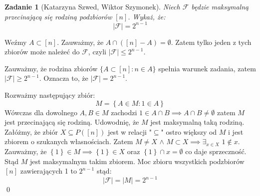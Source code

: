 \documentclass{mwart}
\newtheorem{zad}{Zadanie}[section]
\begin{document}
\begin{zad}[Katarzyna Szwed, Wiktor Szymonek]
    Niech $\mathcal{F}$ będzie maksymalną przecinającą się rodziną podzbiorów $[n]$.
    Wykaż, że:
    \[ |\mathcal{F}| = 2^{n-1} \]
\end{zad}
\begin{mdframed}
    Weźmy $A \subset [n]$. Zauważmy, że $A \cap ([n] - A) = \emptyset$. 
    Zatem tylko jeden z tych zbiorów może należeć do $\mathcal{F}$, czyli $|\mathcal{F}| \leq 2^{n-1}$.

    Zauważmy, że rodzina zbiorów $\{A \subset [n] : n \in A\}$ spełnia warunek zadania, zatem $|\mathcal{F}| \geq 2^{n-1}$. 
    Oznacza to, że $|\mathcal{F}| = 2^{n-1}$.
\end{mdframed}
\begin{mdframed}
    Rozważmy następujący zbiór:
    \[M = \left\{A\in M : 1 \in A\right\}\]
    Wówczas dla dowolnego $A,B \in M$ zachodzi $1 \in A \cap B \implies A\cap B \ne \emptyset$ zatem $M$ jest przecinającą się rodziną.
    \newline Udowodnię, że $M$ jest maksymalną taką rodziną. Załóżmy, że zbiór $X \subseteq P([n])$ 
    jest w relacji "$\subseteq$" ostro większy od $M$ i jest zbiorem o szukanych własnościach.
    \newline Zatem $M \neq X$ $\land$ $M \subset X \implies \exists_{x \in X}$  $ 1 \notin x$. Zauważmy, że 
    \( \left\{1\right\} \in M \implies \left\{1\right\} \in X\) oraz $\left\{1\right\} \cap x = \emptyset$ 
    co daje sprzeczność. Stąd $M$ jest maksymalnym takim zbiorem.
    \newline Moc zbioru wszystkich podzbiorów $[n]$ zawierających 1 to $2^{n-1}$ stąd:
    \[|\mathcal{F}| = |M| = 2^{n-1}\]
    \qed
\end{mdframed}
\end{document}
